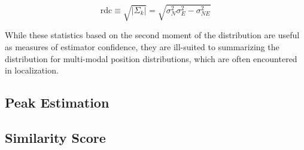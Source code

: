 \begin{equation}
\text{rdc} \equiv \sqrt{| \Sigma_k | } = \sqrt{ \sigma_N^{2} \sigma_E^{2} - \sigma_{NE}^{2} }
\end{equation}

While these statistics based on the second moment of the distribution are useful as measures of estimator confidence, they are ill-suited to summarizing the distribution for multi-modal position distributions, which are often encountered in localization.

\subsection{Peak Estimation}
\label{framework.Statistics.Peak}

\subsection{Similarity Score}
\label{framework.Statistics.Similarity}
